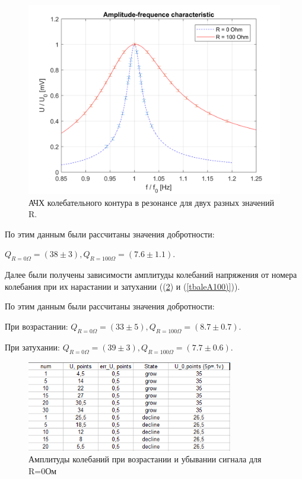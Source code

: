 \documentclass[a4paper,12pt]{article}
\begin{document}
\begin{figure}[h!]
\centering
\includegraphics[width=150mm]{Plot.png}
\caption{АЧХ колебательного контура в резонансе для двух разных значений R.}\label{graph}
\end{figure}

По этим данным были рассчитаны значения добротности: 

$Q_{R=0\Omega} = (38\pm3),     Q_{R=100\Omega} = (7.6\pm1.1)$.

\medskip

Далее были получены зависимости амплитуды колебаний напряжения от номера колебания при их нарастании и затухании ((\ref{tbaleA0)}) и (\ref{tbaleA100)})).

По этим данным были рассчитаны значения добротности: 

При возрастании: $Q_{R=0\Omega} = (33\pm5),    Q_{R=100\Omega} = (8.7\pm0.7)$.

При затухании: $Q_{R=0\Omega} = (39\pm3),    Q_{R=100\Omega} = (7.7\pm0.6)$.

\begin{figure}[ht]
\centering
\includegraphics[width=90mm]{tableA0.png}
\caption{Амплитуды колебаний при возрастании и убывании сигнала для R=0Ом}\label{tbaleA0)}
\end{figure}
\end{document}
